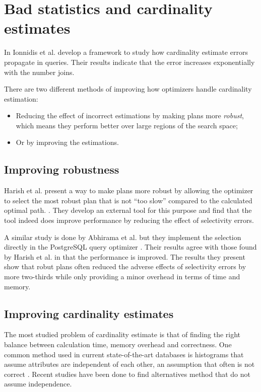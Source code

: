 \section{Bad statistics and cardinality estimates}
In \cite{ioannidis_1991_propagation_otpoeitsojr} Ionnidis et al. develop a framework to study how cardinality estimate errors propagate in queries. Their results indicate that the error increases exponentially with the number joins.

There are two different methods of improving how optimizers handle cardinality estimation:
\begin{itemize}
    \item Reducing the effect of incorrect estimations by making plans more \textit{robust}, which means they perform better over large regions of the search space;
    \item Or by improving the estimations.
\end{itemize}

\subsection{Improving robustness}
Harish et al. present a way to make plans more robust by allowing the optimizer to select the most robust plan that is not ``too slow'' compared to the calculated optimal path. \cite{harish_2008_identifying_irptpdr}. They develop an external tool for this purpose and find that the tool indeed does improve performance by reducing the effect of selectivity errors.

A similar study is done by Abhirama et al. but they implement the selection directly in the PostgreSQL query optimizer \cite{abhirama_2010_stability_otsopcatcops}. Their results agree with those found by Harish et al. in that the performance is improved. The results they present show that robut plans often reduced the adverse effects of selectivity errors by more two-thirds while only providing a minor overhead in terms of time and memory.

\subsection{Improving cardinality estimates}
The most studied problem of cardinality estimate is that of finding the right balance between calculation time, memory overhead and correctness. One common method used in current state-of-the-art databases is histograms that assume attributes are independent of each other, an assumption that often is not correct \cite{ioannidis_2003_history_thoha}. Recent studies have been done to find alternatives method that do not assume independence.

